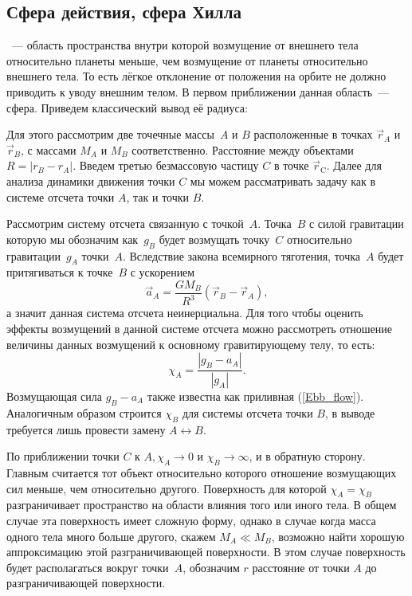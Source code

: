 \subsection{Сфера действия, сфера Хилла}
~--- область пространства внутри которой возмущение от внешнего тела относительно планеты меньше, чем возмущение от планеты относительно внешнего тела. То есть лёгкое отклонение от положения на орбите не должно приводить к уводу внешним телом. В первом приближении данная область~--- сфера. Приведем  классический вывод её радиуса:

Для этого рассмотрим две точечные массы~$A$ и $B$ расположенные в точках $\vec{r}_A$ и $\vec{r}_B$, с массами $M_A$ и $M_B$ соответственно. Расстояние между объектами $R=\left|r_B-r_A\right|$. Введем третью безмассовую частицу $C$ в точке $\vec{r}_{\text{C}}$. Далее для анализа динамики движения точки $C$ мы можем рассматривать задачу как в системе отсчета точки $A$, так и точки $B$.

Рассмотрим систему отсчета связанную с точкой~$A$. Точка~$B$ с силой гравитации которую мы обозначим как~$g_B$ будет возмущать точку~$C$ относительно гравитации~$g_A$ точки~$A$. Вследствие закона всемирного тяготения, точка~$A$ будет притягиваться к точке~$B$ с ускорением 
\begin{equation*}
	\vec{a}_A=\frac{G M_B}{R^3}\left(\vec{r}_B-\vec{r}_A\right),
\end{equation*}
а значит данная система отсчета неинерциальна. Для того чтобы оценить эффекты возмущений в данной системе отсчета можно рассмотреть отношение величины данных возмущений к основному гравитирующему телу, то есть:
\begin{equation*}
	\chi_A=\frac{\left|g_B-a_A\right|}{\left|g_A\right|}.
\end{equation*}
Возмущающая сила $g_B-a_A$ также известна как приливная (\ref{Ebb_flow}). Аналогичным образом строится $\chi_B$ для системы отсчета точки $B$, в выводе требуется лишь провести замену $A \leftrightarrow B$.

По приближении точки $C$ к $A, \chi_A \rightarrow 0$ и $\chi_B \rightarrow \infty$, и в обратную сторону. Главным считается тот объект относительно которого отношение возмущающих сил меньше, чем относительно другого. Поверхность для которой $\chi_A=\chi_B$ разграничивает пространство на области влияния того или иного тела. В общем случае эта поверхность имеет сложную форму, однако в случае когда масса одного тела много больше другого, скажем $M_A \ll M_B$, возможно найти хорошую аппроксимацию этой разграничивающей поверхности. В этом случае поверхность будет располагаться вокруг точки~$A$, обозначим $r$ расстояние от точки $A$ до разграничивающей поверхности.

